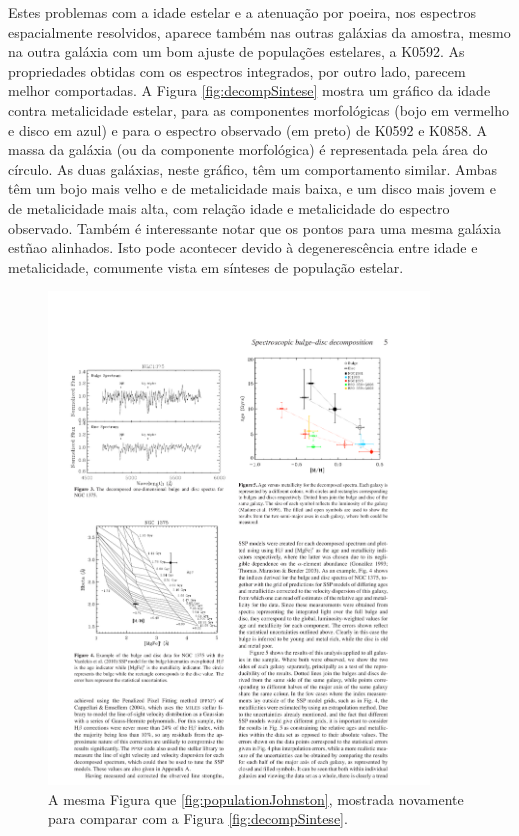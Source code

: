 Estes problemas com a idade estelar e a atenuação por poeira, nos espectros
espacialmente resolvidos, aparece também nas outras galáxias da amostra, mesmo
na outra galáxia com um bom ajuste de populações estelares, a K0592. As
propriedades obtidas com os espectros integrados, por outro lado, parecem melhor
comportadas. A Figura \ref{fig:decompSintese} mostra um gráfico da idade contra
metalicidade estelar, para as componentes morfológicas (bojo em vermelho e disco
em azul) e para o espectro observado (em preto) de K0592 e K0858. A massa da
galáxia (ou da componente morfológica) é representada pela área do círculo.
As duas galáxias, neste gráfico, têm um comportamento similar.
Ambas têm um bojo mais velho e de metalicidade mais baixa, e um disco mais jovem
e de metalicidade mais alta, com relação idade e metalicidade do espectro
observado. Também é interessante notar que os pontos para uma mesma galáxia
estñao alinhados. Isto pode acontecer devido à degenerescência entre idade e
metalicidade, comumente vista em sínteses de população estelar.


\begin{figure}
	\includegraphics[width=0.9\textwidth]{figuras/johnston-pop}
	\caption[A mesma Figura que \ref{fig:populationJohnston}] {A mesma Figura que
	\ref{fig:populationJohnston}, mostrada novamente para comparar com a Figura
	\ref{fig:decompSintese}.}
	\label{fig:populationJohnston2}
\end{figure}

